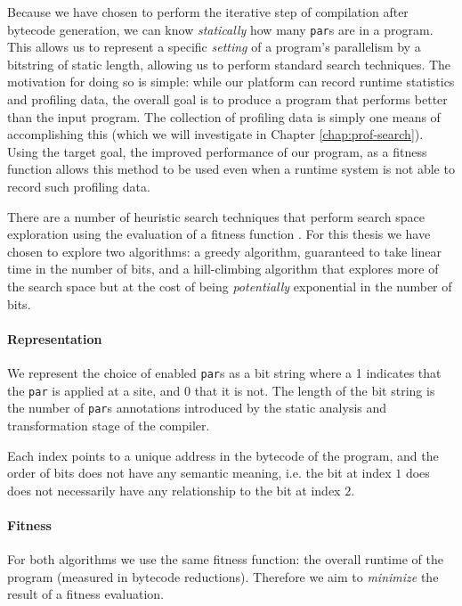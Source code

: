 Because we have chosen to perform the iterative step of compilation after
bytecode generation, we can know \emph{statically} how many \verb|par|s are in
a program. This allows us to represent a specific \emph{setting} of a program's
parallelism by a bitstring of static length, allowing us to perform standard
search techniques. The motivation for doing so is simple: while our platform
can record runtime statistics and profiling data, the overall goal is to
produce a program that performs better than the input program. The collection
of profiling data is simply one means of accomplishing this (which we will
investigate in Chapter \ref{chap:prof-search}). Using the target goal, the
improved performance of our program, as a fitness function allows this method
to be used even when a runtime system is not able to record such profiling
data.

There are a number of heuristic search techniques that perform search space
exploration using the evaluation of a fitness function
\citep{russell1995artificial}. For this thesis we have chosen to explore two
algorithms: a greedy algorithm, guaranteed to take linear time in the number of
bits, and a hill-climbing algorithm that explores more of the search space but
at the cost of being \emph{potentially} exponential in the number of bits.

\paragraph{Representation} 

We represent the choice of enabled \verb-par-s as a bit string where a 1
indicates that the \verb-par- is applied at a site, and 0 that it is not. The
length of the bit string is the number of \verb-par-s annotations introduced by
the static analysis and transformation stage of the compiler.

Each index points to a unique address in the bytecode of the program, and the
order of bits does not have any semantic meaning, i.e. the bit at index $1$
does does not necessarily have any relationship to the bit at index $2$.

\paragraph{Fitness}

For both algorithms we use the same fitness function: the overall runtime of
the program (measured in bytecode reductions). Therefore we aim to
\emph{minimize} the result of a fitness evaluation.

